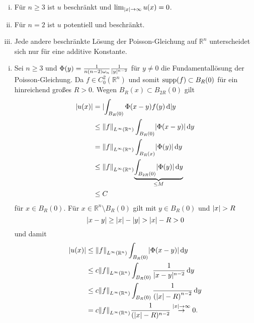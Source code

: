 \begin{bemerkung}
	\begin{enumerate}[(i)]
		\item Für $n \geq3$ ist $u$ beschränkt und $\lim_{\lvert x\rvert \to \infty}u(x)=0$.
		\item Für $n=2$ ist $u$ potentiell und beschränkt.
		\item Jede andere beschränkte Lösung der Poisson-Gleichung auf $\mathbb{R}^n$ unterscheidet sich nur für eine additive Konstante.
	\end{enumerate}
	\begin{beweis}
		\begin{enumerate}[(i)]
			\item Sei $n \geq  3$ und $\Phi(y)= \frac{1}{n(n-2)\omega_n}\frac{1}{\lvert y\rvert^{n-2}}$ für $y \neq 0$ die Fundamentallösung der Poisson-Gleichung. 
			Da $f \in C^2_0(\mathbb{R}^n)$ und somit $ \operatorname{supp}(f) \subset B_R(0)$ für ein hinreichend großes $R > 0$. Wegen $B_R(x) \subset B_{2R}(0)$ gilt
			\begin{align*}
				\abs{u(x)} &= \abs{ \int_{B_R(0)}^{} \Phi(x-y)f(y) \,\mathrm{d}}y \\
				& \leq \norm{f}_{L^{\infty}(\mathbb{R}^n)} \int_{B_R(0)}^{}\abs{\Phi(x-y)} \,\mathrm{d}y \\
				&= \norm{f}_{L^{\infty}(\mathbb{R}^n)} \int_{B_R(x)}^{} \abs{\Phi(y)} \,\mathrm{d}y \\
				& \leq \norm{f}_{L^{\infty}(\mathbb{R}^n)} \underset{\leq M}{\underbrace{\int_{B_{2R}(0)}^{} \abs{\Phi(y)} \,\mathrm{d}y}} \\
				& \leq C
			\end{align*}
			für $x \in B_R(0)$. Für $x \in \mathbb{R}^n \setminus B_R(0)$ gilt mit $y \in B_R(0)$ und $\lvert x\rvert> R$
			\begin{equation}
				\lvert x-y\rvert \geq \lvert x\rvert - \lvert y\rvert > \lvert x\rvert - R > 0 
			\end{equation}
			und damit
			\begin{align*}
				\abs{u(x)} &\leq \norm{f}_{L^{\infty}(\mathbb{R}^n)} \int_{B_R(0)}^{} \abs{ \Phi(x-y)} \,\mathrm{d}y \\
				&\leq c \norm{f}_{L^{\infty}(\mathbb{R}^n)} \int_{B_R(0)}^{} \frac{1}{\abs{x-y}^{n-2}} \,\mathrm{d}y \\
				& \leq  c \norm{f}_{L^{\infty}(\mathbb{R}^n)} \int_{B_R(0)}^{} \frac{1}{\left( \abs{x}-R \right)^{n-2}} \,\mathrm{d}y \\
				& = c \norm{f}_{L^{\infty}(\mathbb{R}^n)} \frac{1}{(\abs{x}-R)^{n-2}} \stackrel{\abs{x}\to \infty}{\to} 0 .

\end{align*}
\end{enumerate}
\end{beweis}
\end{bemerkung}
